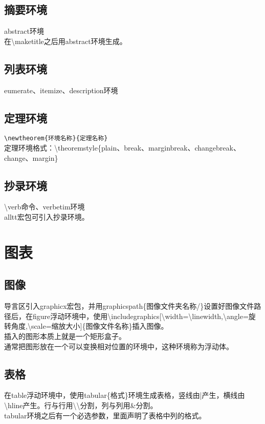 \documentclass{book}%
\begin{document}
    \section{摘要环境}
    abstract环境\\
    在\textbackslash maketitle之后用abstract环境生成。\\
    
    \section{列表环境}
    eumerate、itemize、description环境
    
    \section{定理环境}
    \verb*|\newtheorem{环境名称}{定理名称}|\\
    定理环境格式：\textbackslash theoremstyle\{plain、break、marginbreak、changebreak、change、margin\}
    
    \section{抄录环境}
    \textbackslash verb命令、verbetim环境\\
    alltt宏包可引入抄录环境。\\

    \chapter{图表}
    
    \section{图像}
    导言区引入graphicx宏包，并用graphicspath\{图像文件夹名称/\}设置好图像文件路径后，在figure浮动环境中，使用\textbackslash includegraphics[\textbackslash width=\textbackslash linewidth,\textbackslash angle=旋转角度,\textbackslash scale=缩放大小]\{图像文件名称\}插入图像。\\
    插入的图形本质上就是一个矩形盒子。\\
    通常把图形放在一个可以变换相对位置的环境中，这种环境称为浮动体。\\
    
    \section{表格}
    在table浮动环境中，使用tabular\{格式\}环境生成表格，竖线由|产生，横线由\textbackslash hline产生。行与行用\textbackslash \textbackslash 分割，列与列用\&分割。\\
    tabular环境之后有一个必选参数，里面声明了表格中列的格式。
      
\end{document}
